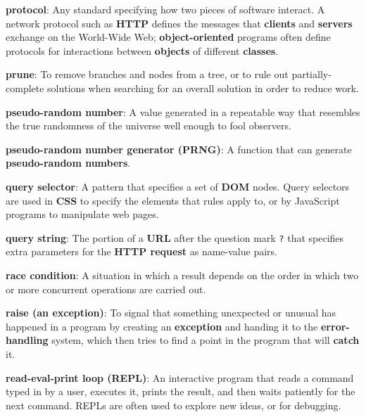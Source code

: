 \documentclass[krantzl]{krantz}
\newcommand{\glosskey}[1]{\textbf{#1}}
\begin{document}
\noindent \textbf{{\newline}\glosskey{protocol}}: 
Any standard specifying how two pieces of software interact. A network protocol such as \glosskey{HTTP} defines the messages that \glosskey{clients} and \glosskey{servers} exchange on the World-Wide Web; \glosskey{object-oriented} programs often define protocols for interactions between \glosskey{objects} of different \glosskey{classes}.


\noindent \textbf{{\newline}\glosskey{prune}}: 
To remove branches and nodes from a tree, or to rule out partially-complete solutions when searching for an overall solution in order to reduce work.


\noindent \textbf{{\newline}\glosskey{pseudo-random number}}: 
A value generated in a repeatable way that resembles the true randomness of the universe well enough to fool observers.


\noindent \textbf{{\newline}\glosskey{pseudo-random number generator} (PRNG)}: 
A function that can generate \glosskey{pseudo-random numbers}.


\noindent \textbf{{\newline}\glosskey{query selector}}: 
A pattern that specifies a set of \glosskey{DOM} nodes.  Query selectors are used in \glosskey{CSS} to specify the elements that rules apply to, or by JavaScript programs to manipulate web pages.


\noindent \textbf{{\newline}\glosskey{query string}}: 
The portion of a \glosskey{URL} after the question mark \texttt{?} that specifies extra parameters for the \glosskey{HTTP request} as name-value pairs.


\noindent \textbf{{\newline}\glosskey{race condition}}: 
A situation in which a result depends on the order in which two or more concurrent operations are carried out.


\noindent \textbf{{\newline}\glosskey{raise (an exception)}}: 
To signal that something unexpected or unusual has happened in a program by creating an \glosskey{exception} and handing it to the \glosskey{error-handling} system, which then tries to find a point in the program that will \glosskey{catch} it.


\noindent \textbf{{\newline}\glosskey{read-eval-print loop} (REPL)}: 
An interactive program that reads a command typed in by a user, executes it, prints the result, and then waits patiently for the next command. REPLs are often used to explore new ideas, or for debugging.
\end{document}
